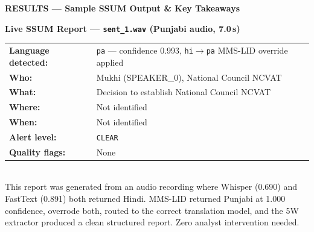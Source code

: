 \documentclass[11pt,a4paper]{article}
\begin{document}
\newpage

\begin{tcolorbox}[enhanced,colback=Navy,colframe=Navy,arc=5pt,boxrule=0pt,
  left=10pt,right=10pt,top=5pt,bottom=5pt]
{\large\bfseries\color{white}RESULTS --- Sample SSUM Output \& Key Takeaways}
\end{tcolorbox}

\vspace{5pt}

\begin{tcolorbox}[enhanced,colback=LAmber,colframe=Amber,arc=6pt,boxrule=1.5pt,
  left=9pt,right=9pt,top=7pt,bottom=7pt]
\textbf{\color{Amber}Live SSUM Report --- \texttt{sent\_1.wav} (Punjabi audio, 7.0\,s)}\\[5pt]
\begin{tabular}{@{}p{3.5cm}p{12cm}@{}}
\textbf{Language detected:} & \texttt{pa} --- confidence 0.993, \texttt{hi}$\to$\texttt{pa} MMS-LID override applied\\[2pt]
\textbf{Who:} & Mukhi (SPEAKER\_0), National Council NCVAT\\[2pt]
\textbf{What:} & Decision to establish National Council NCVAT\\[2pt]
\textbf{Where:} & Not identified\\[2pt]
\textbf{When:} & Not identified\\[2pt]
\textbf{Alert level:} & \texttt{CLEAR}\\[2pt]
\textbf{Quality flags:} & None\\
\end{tabular}\\[5pt]
\small This report was generated from an audio recording where Whisper (0.690) and FastText (0.891) both returned Hindi. MMS-LID returned Punjabi at 1.000 confidence, overrode both, routed to the correct translation model, and the 5W extractor produced a clean structured report. Zero analyst intervention needed.
\end{tcolorbox}

\vspace{6pt}
\end{document}
